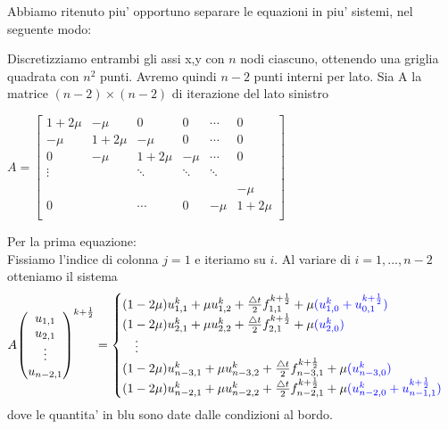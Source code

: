\documentclass[]{article}
\begin{document}
Abbiamo ritenuto piu' opportuno separare le equazioni in piu' sistemi, nel seguente modo:

Discretizziamo entrambi gli assi x,y con $n$ nodi ciascuno, ottenendo una griglia quadrata con $n^2$ punti. Avremo quindi $n-2$ punti interni per lato.
Sia A la matrice $(n-2) \times (n-2)$ di iterazione del lato sinistro
\begin{center}
	$
	A = \begin{bmatrix}
	1+2\mu & -\mu & 0 & 0 & \cdots & 0 \\
	-\mu & 1+2\mu & -\mu & 0 & \cdots & 0\\
	0 & -\mu & 1+2\mu & -\mu & \cdots & 0\\
	\vdots &  & \ddots & \ddots  & \ddots\\
	\\
	& &  &  &   & -\mu\\
	0 &  &  \cdots & 0  & -\mu & 1+2\mu\\ 
	\end{bmatrix}
	$
\end{center}
Per la prima equazione:\\
Fissiamo l'indice di colonna $j = 1$ e iteriamo su $i$. Al variare di $i = 1,...,n-2$  otteniamo il sistema
\begin{equation}
A {\begin{pmatrix}
	u_{1,1}\\
	u_{2,1}\\
	\vdots\\
	u_{n-2,1}
	\end{pmatrix}}^{k+\frac{1}{2}} = 
\begin{cases}
(1-2\mu)u^k_{1,1} + \mu u^k_{1,2} + \frac{\bigtriangleup t}{2} f^{k+\frac{1}{2}}_{1,1} + \mu \color{blue}{(u^k_{1,0} + u^{k+\frac{1}{2}}_{0,1})}\\
(1-2\mu)u^k_{2,1} + \mu u^k_{2,2} + \frac{\bigtriangleup t}{2} f^{k+\frac{1}{2}}_{2,1} + \mu \color{blue}{(u^k_{2,0})}\\
\quad \vdots\\
(1-2\mu)u^k_{n-3,1} + \mu u^k_{n-3,2} + \frac{\bigtriangleup t}{2} f^{k+\frac{1}{2}}_{n-3,1} + \mu \color{blue}{(u^k_{n-3,0})}\\
(1-2\mu)u^k_{n-2,1} + \mu u^k_{n-2,2} + \frac{\bigtriangleup t}{2} f^{k+\frac{1}{2}}_{n-2,1} + \mu \color{blue}{(u^k_{n-2,0} + u^{k+\frac{1}{2}}_{n-1,1})}\\
\end{cases}
\end{equation}
dove le quantita' in blu sono date dalle condizioni al bordo.
\end{document}
